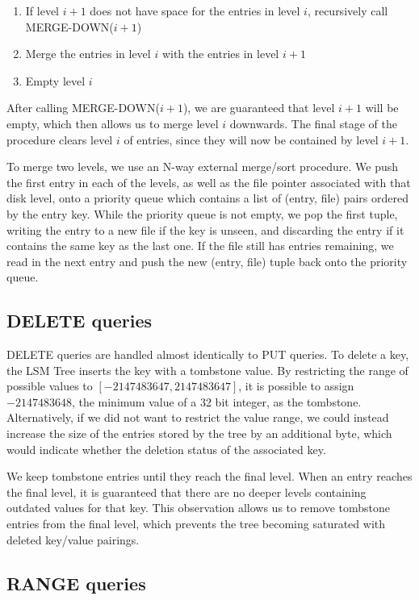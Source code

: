 \documentclass[format=acmtog, review=false]{acmart}
\begin{document}
\begin{enumerate}
  \item If level $i+1$ does not have space for the entries in level $i$, recursively call MERGE-DOWN($i+1$)
  \item Merge the entries in level $i$ with the entries in level $i+1$
  \item Empty level $i$
\end{enumerate}

After calling MERGE-DOWN($i+1$), we are guaranteed that level $i+1$ will be empty, which then allows us to merge level $i$ downwards. The final stage of the procedure clears level $i$ of entries, since they will now be contained by level $i+1$.

To merge two levels, we use an N-way external merge/sort procedure. We push the first entry in each of the levels, as well as the file pointer associated with that disk level, onto a priority queue which contains a list of (entry, file) pairs ordered by the entry key. While the priority queue is not empty, we pop the first tuple, writing the entry to a new file if the key is unseen, and discarding the entry if it contains the same key as the last one. If the file still has entries remaining, we read in the next entry and push the new (entry, file) tuple back onto the priority queue.

\subsection{DELETE queries}

DELETE queries are handled almost identically to PUT queries. To delete a key, the LSM Tree inserts the key with a tombstone value. By restricting the range of possible values to $[-2147483647, 2147483647]$, it is possible to assign $-2147483648$, the minimum value of a 32 bit integer, as the tombstone. Alternatively, if we did not want to restrict the value range, we could instead increase the size of the entries stored by the tree by an additional byte, which would indicate whether the deletion status of the associated key.

We keep tombstone entries until they reach the final level. When an entry reaches the final level, it is guaranteed that there are no deeper levels containing outdated values for that key. This observation allows us to remove tombstone entries from the final level, which prevents the tree becoming saturated with deleted key/value pairings.

\subsection{RANGE queries}
\end{document}
